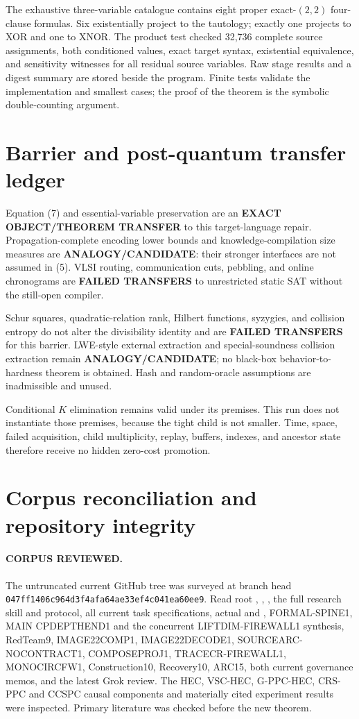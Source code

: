 \documentclass[11pt]{article}
\begin{document}
The exhaustive three-variable catalogue contains eight proper exact-$(2,2)$
four-clause formulas.  Six existentially project to the tautology; exactly
one projects to XOR and one to XNOR.  The product test checked 32,736 complete
source assignments, both conditioned values, exact target syntax, existential
equivalence, and sensitivity witnesses for all residual source variables.
Raw stage results and a digest summary are stored beside the program.  Finite
tests validate the implementation and smallest cases; the proof of the
theorem is the symbolic double-counting argument.

\section{Barrier and post-quantum transfer ledger}
Equation (7) and essential-variable preservation are an
\textbf{EXACT OBJECT/THEOREM TRANSFER} to this target-language repair.
Propagation-complete encoding lower bounds and knowledge-compilation size
measures are \textbf{ANALOGY/CANDIDATE}: their stronger interfaces are not
assumed in (5).  VLSI routing, communication cuts, pebbling, and online
chronograms are \textbf{FAILED TRANSFERS} to unrestricted static SAT without
the still-open compiler.

Schur squares, quadratic-relation rank, Hilbert functions, syzygies, and
collision entropy do not alter the divisibility identity and are
\textbf{FAILED TRANSFERS} for this barrier.  LWE-style external extraction
and special-soundness collision extraction remain
\textbf{ANALOGY/CANDIDATE}; no black-box behavior-to-hardness theorem is
obtained.  Hash and random-oracle assumptions are inadmissible and unused.

Conditional $K$ elimination remains valid under its premises.  This run
does not instantiate those premises, because the tight child is not smaller.
Time, space, failed acquisition, child multiplicity, replay, buffers, indexes,
and ancestor state therefore receive no hidden zero-cost promotion.

\section{Corpus reconciliation and repository integrity}
\paragraph{CORPUS REVIEWED.}
The untruncated current GitHub tree was surveyed at branch head
\texttt{047ff1406c964d3f4afa64ae33ef4c041ea60ee9}.  Read root
, , , the full research skill
and protocol, all current task specifications, actual  and
, FORMAL-SPINE1, MAIN CPDEPTHEND1 and the concurrent
LIFTDIM-FIREWALL1 synthesis, RedTeam9, IMAGE22COMP1,
IMAGE22DECODE1, SOURCEARC-NOCONTRACT1, COMPOSEPROJ1, TRACECR-FIREWALL1,
MONOCIRCFW1, Construction10, Recovery10, ARC15, both current governance
memos, and the latest Grok review.  The HEC, VSC-HEC, G-PPC-HEC, CRS-PPC
and CCSPC causal components and materially cited experiment results were
inspected.  Primary literature was checked before the new theorem.
\end{document}
